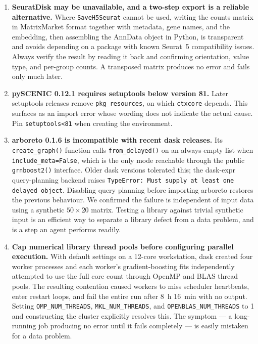 \documentclass[11pt,a4paper]{article}
\begin{document}
\begin{enumerate}[leftmargin=*]
\item \textbf{SeuratDisk may be unavailable, and a two-step export is a reliable alternative.} Where \texttt{SaveH5Seurat} cannot be used, writing the counts matrix in MatrixMarket format together with metadata, gene names, and the embedding, then assembling the AnnData object in Python, is transparent and avoids depending on a package with known Seurat~5 compatibility issues. Always verify the result by reading it back and confirming orientation, value type, and per-group counts. A transposed matrix produces no error and fails only much later.


\item \textbf{pySCENIC 0.12.1 requires setuptools below version 81.} Later setuptools releases remove \texttt{pkg\_resources}, on which \texttt{ctxcore} depends. This surfaces as an import error whose wording does not indicate the actual cause. Pin \texttt{setuptools<81} when creating the environment.

\item \textbf{arboreto 0.1.6 is incompatible with recent dask releases.} Its \texttt{create\_graph()} function calls \texttt{from\_delayed()} on an always-empty list when \texttt{include\_meta=False}, which is the only mode reachable through the public \texttt{grnboost2()} interface. Older dask versions tolerated this; the dask-expr query-planning backend raises \texttt{TypeError: Must supply at least one delayed object}. Disabling query planning before importing arboreto restores the previous behaviour. We confirmed the failure is independent of input data using a synthetic $50 \times 20$ matrix. Testing a library against trivial synthetic input is an efficient way to separate a library defect from a data problem, and is a step an agent performs readily.

\item \textbf{Cap numerical library thread pools before configuring parallel execution.} With default settings on a 12-core workstation, dask created four worker processes and each worker's gradient-boosting fits independently attempted to use the full core count through OpenMP and BLAS thread pools. The resulting contention caused workers to miss scheduler heartbeats, enter restart loops, and fail the entire run after 8~h 16~min with no output. Setting \texttt{OMP\_NUM\_THREADS}, \texttt{MKL\_NUM\_THREADS}, and \texttt{OPENBLAS\_NUM\_THREADS} to 1 and constructing the cluster explicitly resolves this. The symptom --- a long-running job producing no error until it fails completely --- is easily mistaken for a data problem.


\end{enumerate}
\end{document}
